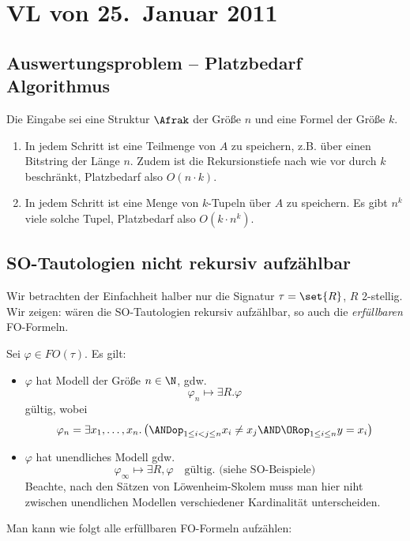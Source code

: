 \section{VL von 25.~Januar 2011}

\subsection{Auswertungsproblem -- Platzbedarf Algorithmus}

Die Eingabe sei eine Struktur $\Afrak$ der Größe $n$ und eine Formel
der Größe $k$.

\begin{enumerate}
  \item In jedem Schritt ist eine Teilmenge von $A$ zu speichern, z.B.
  über einen Bitstring der Länge $n$. Zudem ist die Rekursionstiefe
  nach wie vor durch $k$ beschränkt, Platzbedarf also $O(n\cdot k)$.
  
  \item In jedem Schritt ist eine Menge von $k$-Tupeln über $A$ zu
  speichern. Es gibt $n^k$ viele solche Tupel, Platzbedarf also
  $O(k\cdot n^k)$.
\end{enumerate}

\subsection{SO-Tautologien nicht rekursiv aufzählbar}

Wir betrachten der Einfachheit halber nur die Signatur $\tau=\set{R}$,
$R$ 2-stellig. Wir zeigen: wären die SO-Tautologien rekursiv aufzählbar,
so auch die \textit{erfüllbaren} FO-Formeln.

Sei $\varphi\in FO(\tau)$. Es gilt:
\begin{itemize}
  \item $\varphi$ hat Modell der Größe $n\in\N$, gdw.
  \[
    \varphi_n\mapsto\exists R.\varphi
  \]
  gültig, wobei
  \[
    \varphi_n = \exists x_1,\dots,x_n.\left( \ANDop_{1\leq i < j\leq n} x_i\not=x_j \AND \ORop_{1\leq i\leq n} y=x_i \right)
  \]
  
  \item $\varphi$ hat unendliches Modell gdw.
  \[
    \varphi_\infty \mapsto \exists R,\varphi\quad\text{gültig. (siehe SO-Beispiele)}
  \]
  Beachte, nach den Sätzen von Löwenheim-Skolem muss man hier niht zwischen
  unendlichen Modellen verschiedener Kardinalität unterscheiden.
\end{itemize}

Man kann wie folgt alle erfüllbaren FO-Formeln aufzählen:

